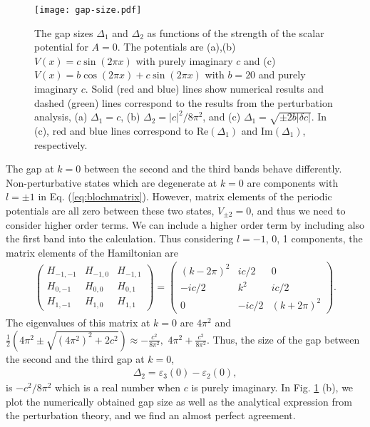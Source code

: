 \documentclass[prb,superscriptaddress,floatfix,twocolumn,showpacs]{revtex4-2}
\begin{document}
\begin{figure}
    \centering
    \texttt{[image: gap-size.pdf]}
    \caption{The gap sizes $\Delta_1$ and $\Delta_2$ as functions of the strength of the scalar potential for $A = 0$. 
    The potentials are (a),(b) $V(x) = c \sin (2\pi x)$ with purely imaginary $c$ and (c) $V(x) = b\cos (2\pi x) + c \sin (2\pi x)$ with $b=20$ and purely imaginary $c$. 
    Solid (red and blue) lines show numerical results and dashed (green) lines correspond to the results from the perturbation analysis, (a) $\Delta_1=c$, (b) $\Delta_2=|c|^2 /8\pi^2$, and (c) $\Delta_1=\sqrt{\pm2b|\delta c|}$.
    In (c), red and blue lines correspond to $\mathrm{Re}(\Delta_1)$ and $\mathrm{Im}(\Delta_1)$, respectively.}
    \label{fig:gap-size}
\end{figure}

The gap at $k=0$ between the second and the third bands behave differently.
Non-perturbative states which are degenerate at $k = 0$ are components with $l = \pm 1$ in Eq. (\ref{eq:blochmatrix}). 
However, matrix elements of the periodic potentials are all zero between these two states, $V_{\pm 2} = 0$, and thus we need to consider higher order terms. We can include a higher order term by including also the first band into the calculation. 
Thus considering $l = -1$, 0, 1 components, the matrix elements of the Hamiltonian are
\begin{align}
    \begin{pmatrix}
    H_{-1,-1} & H_{-1,0} & H_{-1,1} \\
    H_{0,-1} & H_{0,0} & H_{0,1} \\
    H_{1,-1} & H_{1,0} & H_{1,1}
    \end{pmatrix}
    =
    \begin{pmatrix}
    (k-2\pi)^2 & ic/2 & 0 \\
    -ic/2 & k^2 & ic/2 \\
    0 & -ic/2 & (k+2\pi)^2
    \end{pmatrix}.
\end{align}
The eigenvalues of this matrix at $k = 0$ are $4\pi^2$ and $\frac{1}{2}\left( 4\pi^2 \pm \sqrt{(4\pi^2)^2 + 2c^2}\right) \approx -\frac{c^2}{8\pi^2},$ $4\pi^2+\frac{c^2}{8\pi^2}$. 
Thus, the size of the gap between the second and the third gap at $k=0$,
\begin{align}
    \Delta_2=\varepsilon_3(0)-\varepsilon_2(0),
    \label{eq:gap-size_2}
\end{align}
is $-c^2/8\pi^2$ which is a real number when $c$ is purely imaginary. 
In Fig. \ref{fig:gap-size} (b), we plot the numerically obtained gap size as well as the analytical expression from the perturbation theory, and we find an almost perfect agreement.
\end{document}
